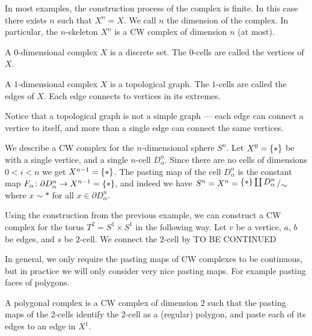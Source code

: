 \documentclass[11pt,a4paper]{article}
\begin{document}
\begin{remark}
  In most examples, the construction process of the complex is finite.
  In this case there exists $n$ such that $X^n = X$.
  We call $n$ the dimension of the complex.
  In particular, the $n$-skeleton $X^n$ is a CW complex of dimension $n$
  (at most).
\end{remark}

\begin{example}
  A $0$-dimensional complex $X$ is a discrete set.
  The $0$-cells are called the vertices of $X$.
\end{example}

\begin{example}
  A $1$-dimensional complex $X$ is a topological graph.
  The $1$-cells are called the edges of $X$.
  Each edge connects to vertices in its extremes.
  \begin{remark}
    Notice that a topological graph is not a simple graph --- each edge
    can connect a vertice to itself, and more than a single edge can
    connect the same vertices.
  \end{remark}
\end{example}

\begin{example}
  We describe a CW complex for the $n$-dimensional sphere $S^n$.
  Let $X^{0} = \set{*}$ be with a single vertice, and a single $n$-cell
  $D^n_{\alpha}$.
  Since there are no cells of dimensions $0 < i < n$ we get $X^{n-1} = \set{*}$.
  The pasting map of the cell $D^n_{\alpha}$ is the constant map
  $F_{\alpha} \colon \partial D^n_{\alpha} \to X^{n-1} = \set{*}$,
  and indeed we have $S^n = X^n = \bigslant{\set{*} \coprod D^n_{\alpha}}{\sim}$
  where $x \sim *$ for all $x \in \partial D^n_{\alpha}$.
\end{example}

\begin{example}
  Using the construction from the previous example, we can construct a CW
  complex for the torus $T^2 = S^1 \times S^1$ in the following way.
  Let $v$ be a vertice, $a$, $b$ be edges, and $s$ be $2$-cell.
  We connect the $2$-cell by
  TO BE CONTINUED
\end{example}

In general, we only require the pasting maps of CW complexes to be continuous,
but in practice we will only consider very nice pasting maps.
For example pasting faces of polygons.

\begin{definition}
  A polygonal complex is a CW complex of dimension $2$ such that the pasting
  maps of the $2$-cells identify the $2$-cell as a (regular) polygon,
  and paste each of its edges to an edge in $X^1$.
\end{definition}
\end{document}
